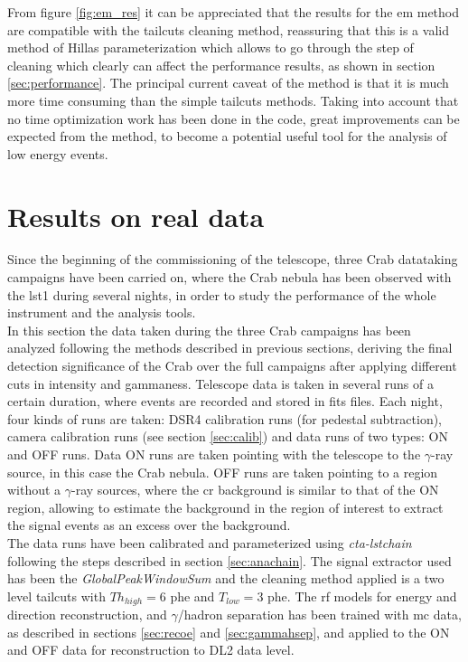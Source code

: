 \documentclass[main.tex]{subfiles}
\begin{document}
From figure \ref{fig:em_res} it can be appreciated that the results for the \gls{em} method are compatible with the tailcuts cleaning method, reassuring that this is a valid method of Hillas parameterization which allows to go through the step of cleaning which clearly can affect the performance results, as shown in section \ref{sec:performance}. The principal current caveat of the method is that it is much more time consuming than the simple tailcuts methods. Taking into account that no time optimization work has been done in the code, great improvements can be expected from the method, to become a potential useful tool for the analysis of low energy events. 

\section{Results on real data} \label{sec:realdata}

Since the beginning of the commissioning of the telescope, three Crab datataking campaigns have been carried on, where the Crab nebula has been observed with the \gls{lst}1 during several nights, in order to study the performance of the whole instrument and the analysis tools.\\
In this section the data taken during the three Crab campaigns has been analyzed following the methods described in previous sections, deriving the final detection significance of the Crab over the full campaigns after applying different cuts in intensity and gammaness. Telescope data is taken in several runs of a certain duration, where events are recorded and stored in fits files. Each night, four kinds of runs are taken: DSR4 calibration runs (for pedestal subtraction), camera calibration runs (see section \ref{sec:calib}) and data runs of two types: ON and OFF runs. Data ON runs are taken pointing with the telescope to the $\gamma$-ray source, in this case the Crab nebula. OFF runs are taken pointing to a region without a $\gamma$-ray sources, where the \gls{cr} background is similar to that of the ON region, allowing to estimate the background in the region of interest to extract the signal events as an excess over the background.\\
The data runs have been calibrated and parameterized using \textit{cta-lstchain} following the steps described in section \ref{sec:anachain}. The signal extractor used has been the \textit{GlobalPeakWindowSum}  and the cleaning method applied is a two level tailcuts with $Th_{high}=6$ phe and $T_{low}=3$ phe. The \gls{rf} models for energy and direction reconstruction, and $\gamma$/hadron separation has been trained with \gls{mc} data, as described in sections \ref{sec:recoe} and \ref{sec:gammahsep}, and applied to the ON and OFF data for reconstruction to DL2 data level.\\
\end{document}
